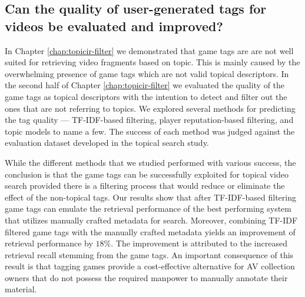 \subsection{Can the quality of user-generated tags for videos be evaluated and improved?}
In Chapter \ref{chap:topicir-filter} we demonstrated that game tags are are not well suited for retrieving video fragments based on topic. This is mainly caused by the overwhelming presence of game tags which are not valid topical descriptors. In the second half of Chapter \ref{chap:topicir-filter} we evaluated the quality of the game tags as topical descriptors with the intention to detect and filter out the ones that are not referring to topics. We explored several methods for predicting the tag quality --- TF-IDF-based filtering, player reputation-based filtering, and topic models to name a few. The success of each method was judged against the evaluation dataset developed in the topical search study.

While the different methods that we studied performed with various success, the conclusion is that the
game tags can be successfully exploited for topical video search provided there is a filtering process that would reduce or eliminate the effect of the non-topical tags. Our results show that after TF-IDF-based filtering game tags can emulate the retrieval performance of the best performing system that utilizes manually crafted metadata for search. Moreover, combining TF-IDF filtered game tags with the manually crafted metadata yields an improvement of retrieval performance by $18\%$. The improvement is attributed to the increased retrieval recall stemming from the game tags. An important consequence of this result is that tagging games provide a cost-effective alternative for AV collection owners that do not possess the required manpower to manually annotate their material.

